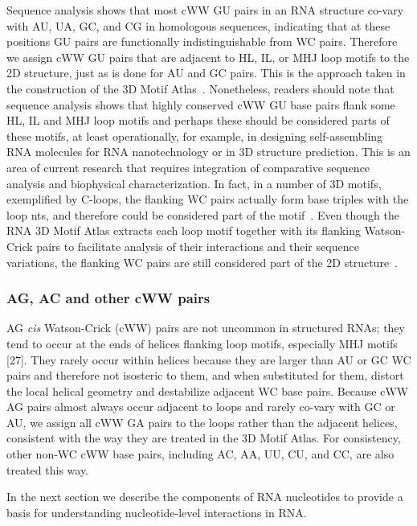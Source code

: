 Sequence analysis shows that most cWW GU pairs in an RNA structure co-vary with
AU, UA, GC, and CG in homologous sequences, indicating that at these positions
GU pairs are functionally indistinguishable from WC pairs. Therefore we assign
cWW GU pairs that are adjacent to HL, IL, or MHJ loop motifs to the 2D
structure, just as is done for AU and GC pairs. This is the approach taken in
the construction of the 3D Motif Atlas~\cite{Petrov2013}. Nonetheless, readers
should note that sequence analysis shows that highly conserved cWW GU base pairs
flank some HL, IL and MHJ loop motifs and perhaps these should be considered
parts of these motifs, at least operationally, for example, in designing
self-assembling RNA molecules for RNA nanotechnology or in 3D structure
prediction. This is an area of current research that requires integration of
comparative sequence analysis and biophysical characterization. In fact, in a
number of 3D motifs, exemplified by C-loops, the flanking WC pairs actually form
base triples with the loop nts, and therefore could be considered part of the
motif~\cite{Lescoute2005}. Even though the RNA 3D Motif Atlas extracts each loop
motif together with its flanking Watson-Crick pairs to facilitate analysis of
their interactions and their sequence variations, the flanking WC pairs are
still considered part of the 2D structure~\cite{Petrov2013}. 

\subsubsection{AG, AC and other cWW pairs}

AG \emph{cis} Watson-Crick (cWW) pairs are not uncommon in structured RNAs; they
tend to occur at the ends of helices flanking loop motifs, especially MHJ motifs
[27]. They rarely occur within helices because they are larger than AU or GC WC
pairs and therefore not isosteric to them, and when substituted for them,
distort the local helical geometry and destabilize adjacent WC base pairs.
Because cWW AG pairs almost always occur adjacent to loops and rarely co-vary
with GC or AU, we assign all cWW GA pairs to the loops rather than the adjacent
helices, consistent with the way they are treated in the 3D Motif Atlas. For
consistency, other non-WC cWW base pairs, including AC, AA, UU, CU, and CC, are
also treated this way.

In the next section we describe the components of RNA nucleotides to provide a
basis for understanding nucleotide-level interactions in RNA\@. 

